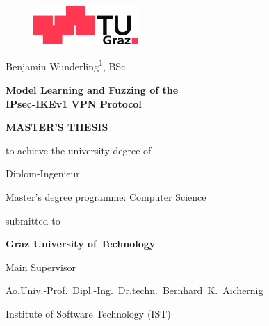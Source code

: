 \begin{titlepage}
\begin{center}
\begin{figure}[!ht]
\centerline{\includegraphics[width=4cm,keepaspectratio=true]{images/tug}}
\end{figure}	
	
\vspace*{28mm}

{\LARGE Benjamin Wunderling\textsuperscript{1}, BSc}\\

\vspace{16mm}

{\LARGE \bf  Model Learning and Fuzzing of the \\ IPsec-IKEv1 VPN Protocol\\}

\vspace{16mm}

{\Large \bf MASTER'S THESIS}\\

\vspace{6mm}

{\large to achieve the university degree of}

\vspace{4mm}

{\large Diplom-Ingenieur}

\vspace{4mm}

{\large Master's degree programme: Computer Science}

\vspace{16mm}

{\large submitted to}

\vspace{4mm}

{\large \bf Graz University of Technology}

\vspace{12mm}

{\large Main Supervisor}

{\large Ao.Univ.-Prof.\ Dipl.-Ing.\ Dr.techn.\ Bernhard\ K.\ Aichernig}

{\large Institute of Software Technology (IST)}

\vspace{6mm}


\end{center}
\end{titlepage}
